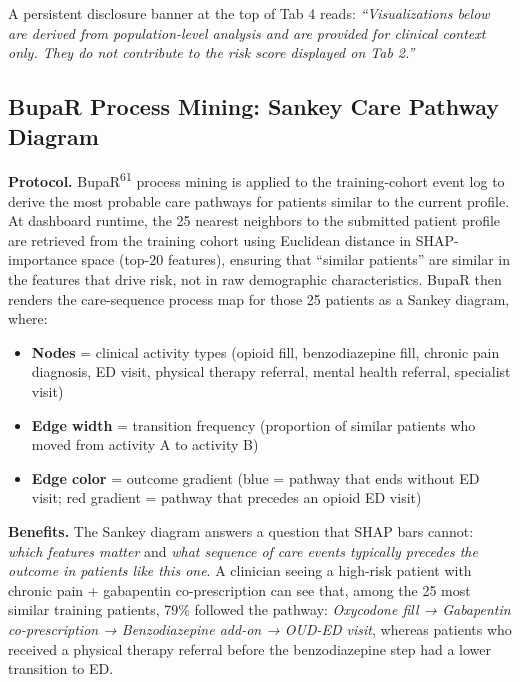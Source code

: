 \documentclass[
  12pt,
]{book}
\providecommand{\tightlist}{%
  \setlength{\itemsep}{0pt}\setlength{\parskip}{0pt}}
\begin{document}
A persistent disclosure banner at the top of Tab 4 reads:
\emph{``Visualizations below are derived from population-level analysis
and are provided for clinical context only. They do not contribute to
the risk score displayed on Tab 2.''}

\subsection{BupaR Process Mining: Sankey Care Pathway
Diagram}\label{bupar-process-mining-sankey-care-pathway-diagram}

\textbf{Protocol.} BupaR\textsuperscript{61} process mining is applied
to the training-cohort event log to derive the most probable care
pathways for patients similar to the current profile. At dashboard
runtime, the 25 nearest neighbors to the submitted patient profile are
retrieved from the training cohort using Euclidean distance in
SHAP-importance space (top-20 features), ensuring that ``similar
patients'' are similar in the features that drive risk, not in raw
demographic characteristics. BupaR then renders the care-sequence
process map for those 25 patients as a Sankey diagram, where:

\begin{itemize}
\tightlist
\item
  \textbf{Nodes} = clinical activity types (opioid fill, benzodiazepine
  fill, chronic pain diagnosis, ED visit, physical therapy referral,
  mental health referral, specialist visit)
\item
  \textbf{Edge width} = transition frequency (proportion of similar
  patients who moved from activity A to activity B)
\item
  \textbf{Edge color} = outcome gradient (blue = pathway that ends
  without ED visit; red gradient = pathway that precedes an opioid ED
  visit)
\end{itemize}

\textbf{Benefits.} The Sankey diagram answers a question that SHAP bars
cannot: \emph{which features matter} and \emph{what sequence of care
events typically precedes the outcome in patients like this one}. A
clinician seeing a high-risk patient with chronic pain + gabapentin
co-prescription can see that, among the 25 most similar training
patients, 79\% followed the pathway: \emph{Oxycodone fill → Gabapentin
co-prescription → Benzodiazepine add-on → OUD-ED visit}, whereas
patients who received a physical therapy referral before the
benzodiazepine step had a lower transition to ED.
\end{document}
